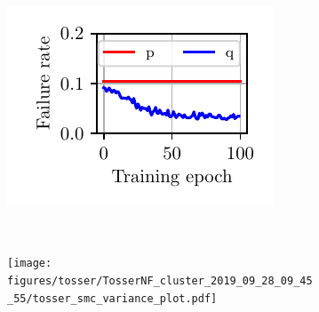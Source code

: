 \begin{figure}[t]
    \begin{subfigure}[t]{0.24\textwidth}
        \centering
        \includegraphics[width=\textwidth]{figures/tosser/TosserNF_cluster_2019_09_28_09_45_55/tosser_nf_bot_rate.pdf}
        \vspace{-0.8cm}
        \caption{ }
        \label{fig:tosser:ar}
    \end{subfigure}%
    ~ 
    \begin{subfigure}[t]{0.24\textwidth}
        \centering
        \texttt{[image: figures/tosser/TosserNF\_cluster\_2019\_09\_28\_09\_45\_55/tosser\_smc\_variance\_plot.pdf]}
        \vspace{-0.8cm}
        \caption{ }
        \label{fig:tosser:smc:var}
    \end{subfigure}
    

\end{figure}

